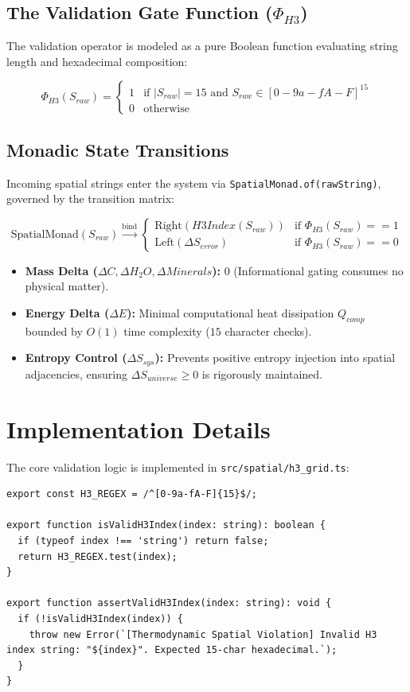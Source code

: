 \documentclass[11pt, a4paper]{article}
\begin{document}
\subsection{The Validation Gate Function ($\Phi_{H3}$)}
The validation operator is modeled as a pure Boolean function evaluating string length and hexadecimal composition:

$$\Phi_{H3}(S_{raw}) = \begin{cases} 
1 & \text{if } |S_{raw}| = 15 \text{ and } S_{raw} \in [0-9a-fA-F]^{15} \\
0 & \text{otherwise}
\end{cases}$$

\subsection{Monadic State Transitions}
Incoming spatial strings enter the system via \texttt{SpatialMonad.of(rawString)}, governed by the transition matrix:

$$\text{SpatialMonad}(S_{raw}) \xrightarrow{\text{bind}} \begin{cases} 
\text{Right}(H3Index(S_{raw})) & \text{if } \Phi_{H3}(S_{raw}) == 1 \\
\text{Left}(\Delta S_{error}) & \text{if } \Phi_{H3}(S_{raw}) == 0 
\end{cases}$$

\begin{itemize}
    \item \textbf{Mass Delta ($\Delta C, \Delta H_2O, \Delta Minerals$):} $0$ (Informational gating consumes no physical matter).
    \item \textbf{Energy Delta ($\Delta E$):} Minimal computational heat dissipation $Q_{comp}$ bounded by $O(1)$ time complexity ($15$ character checks).
    \item \textbf{Entropy Control ($\Delta S_{sys}$):} Prevents positive entropy injection into spatial adjacencies, ensuring $\Delta S_{universe} \ge 0$ is rigorously maintained.
\end{itemize}

\section{Implementation Details}
The core validation logic is implemented in \texttt{src/spatial/h3\_grid.ts}:

\begin{verbatim}
export const H3_REGEX = /^[0-9a-fA-F]{15}$/;

export function isValidH3Index(index: string): boolean {
  if (typeof index !== 'string') return false;
  return H3_REGEX.test(index);
}

export function assertValidH3Index(index: string): void {
  if (!isValidH3Index(index)) {
    throw new Error(`[Thermodynamic Spatial Violation] Invalid H3 index string: "${index}". Expected 15-char hexadecimal.`);
  }
}
\end{verbatim}
\end{document}
